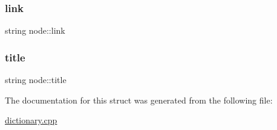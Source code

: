\hypertarget{structnode_a3ce953da0e17204565cb4599ca6a584e}{}\label{structnode_a3ce953da0e17204565cb4599ca6a584e} 
\subsubsection{\texorpdfstring{link}{link}}
{\footnotesize\ttfamily string node\+::link}

\hypertarget{structnode_a79b31177c413f7066ba1e0e9dc203c05}{}\label{structnode_a79b31177c413f7066ba1e0e9dc203c05} 
\subsubsection{\texorpdfstring{title}{title}}
{\footnotesize\ttfamily string node\+::title}



The documentation for this struct was generated from the following file\+:\begin{DoxyCompactItemize}
\item 
\hyperlink{dictionary_8cpp}{dictionary.\+cpp}\end{DoxyCompactItemize}
